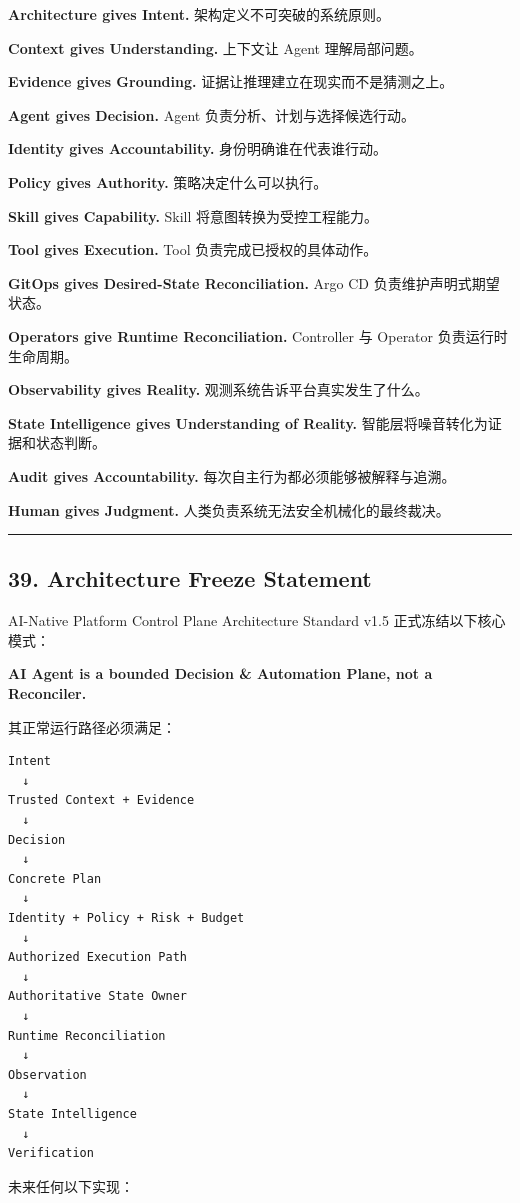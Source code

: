 \documentclass[11pt,a4paper]{article}
\begin{document}
\begin{gfmBlockquote}
\textbf{Architecture gives Intent.}
架构定义不可突破的系统原则。

\textbf{Context gives Understanding.}
上下文让 Agent 理解局部问题。

\textbf{Evidence gives Grounding.}
证据让推理建立在现实而不是猜测之上。

\textbf{Agent gives Decision.}
Agent 负责分析、计划与选择候选行动。

\textbf{Identity gives Accountability.}
身份明确谁在代表谁行动。

\textbf{Policy gives Authority.}
策略决定什么可以执行。

\textbf{Skill gives Capability.}
Skill 将意图转换为受控工程能力。

\textbf{Tool gives Execution.}
Tool 负责完成已授权的具体动作。

\textbf{GitOps gives Desired-State Reconciliation.}
Argo CD 负责维护声明式期望状态。

\textbf{Operators give Runtime Reconciliation.}
Controller 与 Operator 负责运行时生命周期。

\textbf{Observability gives Reality.}
观测系统告诉平台真实发生了什么。

\textbf{State Intelligence gives Understanding of Reality.}
智能层将噪音转化为证据和状态判断。

\textbf{Audit gives Accountability.}
每次自主行为都必须能够被解释与追溯。

\textbf{Human gives Judgment.}
人类负责系统无法安全机械化的最终裁决。
\end{gfmBlockquote}
\vspace{0.5em}\hrule\vspace{0.5em}
\subsection{39. Architecture Freeze Statement}
AI-Native Platform Control Plane Architecture Standard v1.5 正式冻结以下核心模式：

\begin{gfmBlockquote}
\textbf{AI Agent is a bounded Decision \& Automation Plane, not a Reconciler.}
\end{gfmBlockquote}
其正常运行路径必须满足：

\begin{lstlisting}[language=text]
Intent
  ↓
Trusted Context + Evidence
  ↓
Decision
  ↓
Concrete Plan
  ↓
Identity + Policy + Risk + Budget
  ↓
Authorized Execution Path
  ↓
Authoritative State Owner
  ↓
Runtime Reconciliation
  ↓
Observation
  ↓
State Intelligence
  ↓
Verification
\end{lstlisting}
未来任何以下实现：
\end{document}
